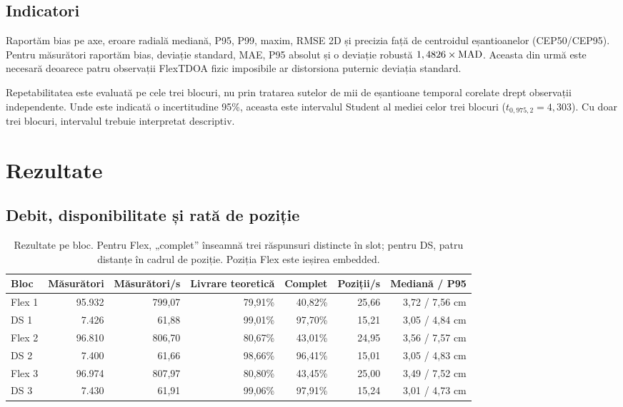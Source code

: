 \documentclass[11pt,a4paper]{article}
\begin{document}
\subsection{Indicatori}

Raportăm bias pe axe, eroare radială mediană, P95, P99, maxim, RMSE 2D și
precizia față de centroidul eșantioanelor (CEP50/CEP95). Pentru măsurători
raportăm bias, deviație standard, MAE, P95 absolut și o deviație robustă
$1,4826\times{\rm MAD}$. Aceasta din urmă este necesară deoarece patru
observații FlexTDOA fizic imposibile ar distorsiona puternic deviația standard.

Repetabilitatea este evaluată pe cele trei blocuri, nu prin tratarea sutelor de
mii de eșantioane temporal corelate drept observații independente. Unde este
indicată o incertitudine 95\%, aceasta este intervalul Student al mediei celor
trei blocuri ($t_{0,975,2}=4,303$). Cu doar trei blocuri, intervalul trebuie
interpretat descriptiv.

\section{Rezultate}

\subsection{Debit, disponibilitate și rată de poziție}

\begin{table}[H]
  \centering
  \caption{Rezultate pe bloc. Pentru Flex, „complet” înseamnă trei răspunsuri
  distincte în slot; pentru DS, patru distanțe în cadrul de poziție. Poziția
  Flex este ieșirea embedded.}
  \scriptsize
  \begin{tabular}{lrrrrrr}
    \toprule
    Bloc & Măsurători & Măsurători/s & Livrare teoretică & Complet & Poziții/s &
      Mediană / P95\\
    \midrule
    Flex 1 & 95.932 & 799,07 & 79,91\% & 40,82\% & 25,66 & 3,72 / 7,56 cm\\
    DS 1   & 7.426  & 61,88  & 99,01\% & 97,70\% & 15,21 & 3,05 / 4,84 cm\\
    Flex 2 & 96.810 & 806,70 & 80,67\% & 43,01\% & 24,95 & 3,56 / 7,57 cm\\
    DS 2   & 7.400  & 61,66  & 98,66\% & 96,41\% & 15,01 & 3,05 / 4,83 cm\\
    Flex 3 & 96.974 & 807,97 & 80,80\% & 43,45\% & 25,00 & 3,49 / 7,52 cm\\
    DS 3   & 7.430  & 61,91  & 99,06\% & 97,91\% & 15,24 & 3,01 / 4,73 cm\\
    \bottomrule
  \end{tabular}
\end{table}
\end{document}
